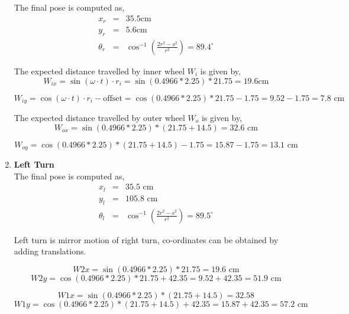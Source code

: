 \begin{enumerate}
The final pose is computed as,
\begin{equation}
\begin{array}{rcl}
x_r &=& 35.5 \text{cm} \\
y_r &=& 5.6 \text{cm} \\
\theta_r &=& \cos^{-1}\left(\frac{2r^2 - s^2}{r^2}\right) = 89.4^{\circ}
\end{array}
\end{equation}

The expected distance travelled by inner wheel $W_i$ is given by,
\begin{equation}
W_{ix} = \sin(\omega \cdot t) \cdot r_i = \sin(0.4966 * 2.25) * 21.75 = 19.6 \text{cm}
\end{equation}

\begin{equation}
W_{iy} = \cos(\omega \cdot t) \cdot r_i - \text{offset} =  \cos(0.4966 * 2.25) * 21.75 - 1.75 = 9.52 - 1.75 = 7.8 \text{ cm}
\end{equation}

The expected distance travelled by outer wheel $W_o$ is given by,
\begin{equation}
W_{ox} = \sin(0.4966 * 2.25) * (21.75 + 14.5) = 32.6 \text{ cm}
\end{equation}

\begin{equation}
W_{oy} = \cos(0.4966 * 2.25) * (21.75 + 14.5) - 1.75 = 15.87 - 1.75 = 13.1 \text{ cm}
\end{equation}

\item \textbf{Left Turn} \\
The final pose is computed as,
\begin{equation}
\begin{array}{rcl}
x_l &=& 35.5 \text{ cm} \\
y_l &=& 105.8 \text{ cm} \\
\theta_l &=& \cos^{-1}\left(\frac{2r^2 - s^2}{r^2}\right) = 89.5^{\circ}
\end{array}
\end{equation}
	
Left turn is mirror motion of right turn, co-ordinates can be obtained by adding translations. 
	
	$$W2x = \sin(0.4966 * 2.25) * 21.75 = 19.6 \text{ cm}$$
	$$W2y = \cos(0.4966 * 2.25) * 21.75 + 42.35 = 9.52 + 42.35 = 51.9 \text{ cm}$$
	
	$$W1x = \sin(0.4966 * 2.25) * (21.75 + 14.5) = 32.58$$
	$$W1y = \cos(0.4966 * 2.25) * (21.75 + 14.5) + 42.35 = 15.87 + 42.35 = 57.2 \text{ cm}$$
	
	
\end{enumerate}

